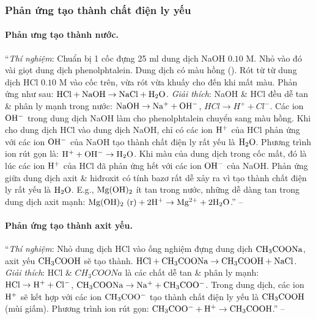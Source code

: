 \documentclass[oneside]{book}
\numberwithin{equation}{section}
\begin{document}
\subsubsection{Phản ứng tạo thành chất điện ly yếu}

\paragraph{Phản ưng tạo thành nước.} ``\textit{Thí nghiệm}: Chuẩn bị 1 cốc đựng 25 ml dung dịch NaOH $0.10$ M. Nhỏ vào đó vài giọt dung dịch phenolphtalein. Dung dịch có màu hồng (\cite[Hình 1.7: \textsf{Màu của phenolphtalein trong môi trường kiềm}, p. 25]{SGK_Hoa_Hoc_11_nang_cao}). Rót từ từ dung dịch HCl $0.10$ M vào cốc trên, vừa rót vừa khuấy cho đến khi mất màu. Phản ứng như sau: $\rm HCl + NaOH\to NaCl + H_2O$. \textit{Giải thích}: NaOH \& HCl đều dễ tan \& phân ly mạnh trong nước: $\rm NaOH\to Na^+ + OH^-$, $HCl\to H^+ + Cl^-$. Các ion $\rm OH^-$ trong dung dịch NaOH làm cho phenolphtalein chuyển sang màu hồng. Khi cho dung dịch HCl vào dung dịch NaOH, chỉ có các ion $\rm H^+$ của HCl phản ứng với các ion $\rm OH^-$ của NaOH tạo thành chất điện ly rất yếu là $\rm H_2O$. Phương trình ion rút gọn là: $\rm H^+ + OH^-\to H_2O$. Khi màu của dung dịch trong cốc mất, đó là lúc các ion $\rm H^+$ của HCl đã phản ứng hết với các ion $\rm OH^-$ của NaOH. Phản ứng giữa dung dịch axit \& hiđroxit có tính bazơ rất dễ xảy ra vì tạo thành chất điện ly rất yếu là $\rm H_2O$. E.g., $\rm Mg(OH)_2$ ít tan trong nước, những dễ dàng tan trong dung dịch axit mạnh: $\rm Mg(OH)_2\ (r) + 2H^+\to Mg^{2+} + 2H_2O$.'' -- \cite[p. 25]{SGK_Hoa_Hoc_11_nang_cao}

\paragraph{Phản ứng tạo thành axit yếu.} ``\textit{Thí nghiệm}: Nhỏ dung dịch HCl vào ống nghiệm đựng dung dịch $\rm CH_3COONa$, axit yếu $\rm CH_3COOH$ sẽ tạo thành. $\rm HCl + CH_3COONa\to CH_3COOH + NaCl$. \textit{Giải thích}: HCl \& $CH_3COONa$ là các chất dễ tan \& phân ly mạnh: $\rm HCl\to H^+ + Cl^-$, $\rm CH_3COONa\to Na^+ + CH_3COO^-$. Trong dung dịch, các ion $\rm H^+$ sẽ kết hợp với các ion $\rm CH_3COO^-$ tạo thành chất điện ly yếu là $\rm CH_3COOH$ (mùi giấm). Phương trình ion rút gọn: $\rm CH_3COO^- + H^+\to CH_3COOH$.'' -- \cite[pp. 25--26]{SGK_Hoa_Hoc_11_nang_cao}
\end{document}
